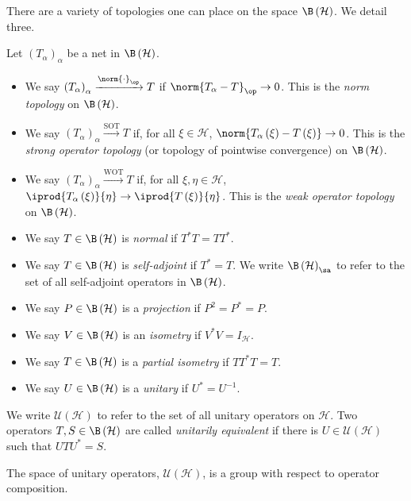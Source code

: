 There are a variety of topologies one can place on the space $\B\left(\mathcal{H}\right)$. We detail three.
\begin{definition}\label{def:operator_topologies}
  Let $\left(T_{\alpha}\right)_{\alpha}$ be a net in $\B\left(\mathcal{H}\right)$.
  \begin{itemize}
    \item We say $\left(T_{\alpha}\right)_{\alpha}\xrightarrow{\norm{\cdot}_{\op}} T$ if $\norm{T_{\alpha} - T}_{\op}\rightarrow 0$. This is the \textit{norm topology} on $\B\left(\mathcal{H}\right)$.
    \item We say $\left(T_{\alpha}\right)_{\alpha}\xrightarrow{ \text{SOT} } T$ if, for all $\xi\in \mathcal{H}$, $\norm{T_{\alpha}\left(\xi\right) - T\left(\xi\right)}\rightarrow 0$. This is the \textit{strong operator topology} (or topology of pointwise convergence) on $\B\left(\mathcal{H}\right)$.
    \item We say $\left(T_{\alpha}\right)_{\alpha}\xrightarrow{\text{WOT}}T$ if, for all $\xi,\eta\in \mathcal{H}$, $ \iprod{T_{\alpha}\left(\xi\right)}{\eta}\rightarrow \iprod{T\left(\xi\right)}{\eta} $. This is the \textit{weak operator topology} on $\B\left(\mathcal{H}\right)$.
  \end{itemize}
\end{definition}
\begin{definition}\label{def:distinguished_operators}\hfill
  \begin{itemize}
    \item We say $T\in \B\left(\mathcal{H}\right)$ is \textit{normal} if $T^{\ast}T = TT^{\ast}$.
    \item We say $T\in \B\left(\mathcal{H}\right)$ is \textit{self-adjoint} if $T^{\ast}= T$. We write $\B\left(\mathcal{H}\right)_{\sa}$ to refer to the set of all self-adjoint operators in $\B\left(\mathcal{H}\right)$.
    \item We say $P\in \B\left(\mathcal{H}\right)$ is a \textit{projection} if $P^2 = P^{\ast} = P$.
    \item We say $V\in \B\left(\mathcal{H}\right)$ is an \textit{isometry} if $V^{\ast}V = I_{\mathcal{H}}$.
    \item We say $T\in \B\left(\mathcal{H}\right)$ is a \textit{partial isometry} if $TT^{\ast}T = T$.
    \item We say $U\in \B\left(\mathcal{H}\right)$ is a \textit{unitary} if $U^{\ast} = U^{-1}$.
  \end{itemize}
  We write $\mathcal{U}\left(\mathcal{H}\right)$ to refer to the set of all unitary operators on $\mathcal{H}$. Two operators $T,S\in \B\left(\mathcal{H}\right)$ are called \textit{unitarily equivalent} if there is $U\in \mathcal{U}\left(\mathcal{H}\right)$ such that $UTU^{\ast} = S$.\newline

  The space of unitary operators, $\mathcal{U}\left(\mathcal{H}\right)$, is a group with respect to operator composition.
\end{definition}
